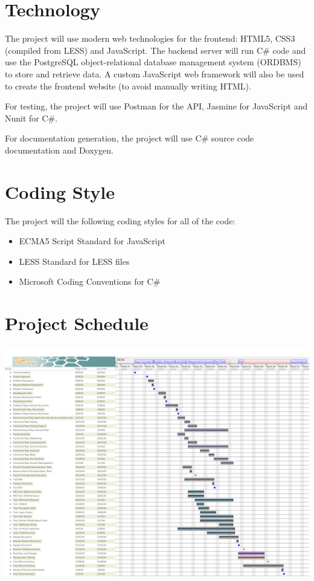 \documentclass{article}
\begin{document}
\section{Technology}
The project will use modern web technologies for the frontend: HTML5, CSS3
(compiled from LESS) and JavaScript. The backend server will run C\# code and
use the PostgreSQL object-relational database management system (ORDBMS) to
store and retrieve data. A custom JavaScript web framework will also be used to
create the frontend website (to avoid manually writing HTML).

For testing, the project will use Postman for the API, Jasmine for JavaScript
and Nunit for C\#.

For documentation generation, the project will use C\# source code
documentation and Doxygen.

\section{Coding Style}
The project will the following coding styles for all of the code:
\begin{itemize}
  \item ECMA5 Script Standard for JavaScript
  \item LESS Standard for LESS files
  \item Microsoft Coding Conventions for C\#
\end{itemize}

\section{Project Schedule}

\includegraphics[width=\textwidth]{../../ProjectSchedule/schedule}
\end{document}
